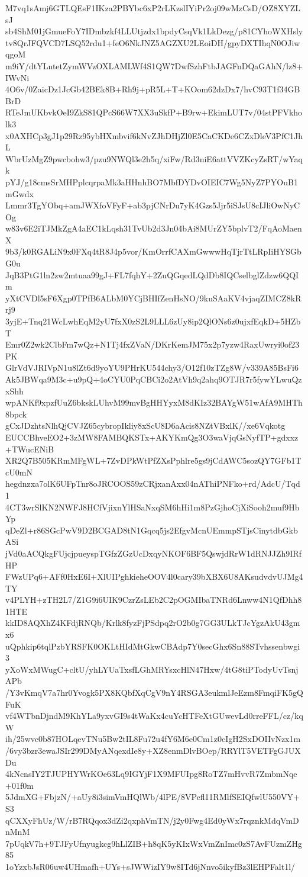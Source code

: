 M7vq1sAmj6GTLQEsF1IKza2PBYbc6xP2rLKzslIYiPr2oj09wMzCsD/OZ8XYZLsJ
sb4ShM01jGmueFoY7IDmbzkf4LLUtjzdx1bpdyCsqVk1LkDezg/p81CYhoWXHsly
tv8QrJFQVCD7LSQ52rdu1+feO6NkJNZ5AGZXU2LEoiDH/gpyDXTIhqN0OJiwqgoM
m9iY/dtYLntetZymWVzOXLAMLWf4S1QW7DwfSzhFtbJAGFnDQaGAhN/lz8+IWvNi
4O6v/0ZaicDz1JcGb42BEk8B+Rh9j+pR5L+T+KOom62dzDx7/hvC93T1f34GBBrD
RTeJmUKbvkOeI9ZkS81QPcS66W7XX3uSkfP+B9rw+EkimLUT7v/04stPFVkholk3
x0AXHCp3gJ1p29Rz95ybHXmbvif6kNvZJhDHjZl0E5CaCKDe6CZxDleV3PfC1JhL
WbrUzMgZ9pwcbohw3/pzu9NWQl3e2h5q/xiFw/Rd3niE6attVVZKcyZsRT/wYaqk
pYJ/g18cmsSrMHPplcqrpaMk3aHHnhBO7MbfDYDvOIEIC7Wg5NyZ7PYOuB1mGwdx
Lmmr3TgYObq+amJWXfoVFyF+ab3pjCNrDu7yK4Gzs5Jjr5iSJsU8cIJliOwNyCOg
w83v6E2iTJMkZgA4aEC1kLqsh31TvUb2d3Jn04bAi8MUrZY5bplvT2/FqAoMaenX
9b3/k0RGALiN9x0FXq4tR8J4p5vor/KmOrrfCAXmGwwwHqTjrTtLRpIiHYSGbG0u
JqB3PtG1ln2zw2mtuaa99gJ+FL7fqhY+2ZuQGqedLQdDb8IQCselbglZdzw6QQIm
yXtCVDl5sF6Xgp0TPfB6ALbM0YCjBHIfZenHsNO/9kuSAaKV4vjaqZIMCZ8kRrj9
3yjE+Tnq21WcLwhEqM2yU7fxX0zS2L9LLL6zUy8ip2QlONs6z0ujxfEqkD+5HZbT
Emr0Z2wk2ClbFm7wQz+N1Tj4fxZVaN/DKrKemJM75x2p7yzw4RaxUwryi0of23PK
GlrVdVJRIVpN1u8lZt6d9yoYU9PHrKU544chy3/O12f10zTZg8W/v339A85BsFi6
Ak5JBWqa9M3c+u9pQ+4oCYU0PqCBCi2o2AtVh9q2ahq9OTJR7r5fywYLwuQzxShh
wpANKf9xpzfUuZ6bkskLUhvM99mvBgHHYyxM8dKIz32BAYgW51wAfA9MHTh8bpck
gCxJDzhtsNlhQjCVJZ65cybropIkliy8xScU8D6aAcis8NZtVBxlK//xe6Vqkotg
EUCCBhveEO2+3zMW8FAMBQKSTx+AKYKmQg3O3waVjqGsNyfTP+gdxxz+TWucENiB
XR2Q7B505KRmMFgWL+7ZvDPkWtPfZXsPphlre5gs9jCdAWC5sozQY7GFb1TcU0mN
hegdnzxa7olK6UFpTnr8oJRCOOS59zCRjxanAxx04nAThiPNFko+rd/AdcU/Tqd1
4CT3wrSlKN2NWFJ8HCfVjixnYlHSaNxqSM6hHi1m8PzGjhoCjXiSooh2muf9HbYp
qDeZl+r86SGcPwV9D2BCGAD8tN1Gqcq5js2EfgvMcnUEmmpSTjsCinytdbGkbASi
jVd0aACQkgFUjcjpueyspTGfzZGzUcDxqyNKOF6BF5QswjdRrW1dRNJJZh9IRfHP
FWzUPq6+AFf0HxE6I+XlUIPghkieheOOV4l0cary39bXBX6U8AKsudvdvUJMg4TY
v4PLYH+zTH2L7/Z1G9i6UIK9CzrZsLEb2C2pOGMIbaTNRd6Lnww4N1QfDhh81HTE
kkID8AQXhZ4KFdjRNQb/Krlk8fyzFjPSdpq2rO2b0g7GG3ULkTJcYgzAkU43gmx6
uQphkip6tqlPzbYRSFK0OKLtHIdMtGkwCBAdp7Y0secGhx6Sn88STvhssenbwgi3
yXoWxMWugC+cltU/yhLYUaTxsfLGhMRYsxcHlN47Hxw/4tG8tiPTodyUvTsnjAPb
/Y3vKmqV7a7hr0Yvogk5PX8KQbfXqCgV9nY4RSGA3eukmlJeEzm8FmqiFK5gQFuK
vf4WTbnDjndM9KhYLa9yxvGI9s4tWaKx4cuYcHTFeXtGUwevLd0rreFFL/cz/kqW
ih/25wvc0b87HOLqevTNu5Bw2tIL8Fu72u4fY6M6e0Cm1z0cIgH2SxDOIIvNzx1m
/6vy3bzr3ewaJSIr299DMyANqexdIe8y+XZ8enmDlvBOep/RRYlT5VETFgGJUXDu
4kNcnsIY2TJUPHYWrKOe63Lq9IGYjF1X9MFUIpg8RoTZ7mHvvR7ZmbmNqe+01f0m
5JdmXG+FbjzN/+aUy8i3simVmHQlWb/4lPE/8VPefl11RMlfSEIQfwlU550VY+S3
qCXXyFhUz/W/rB7RQqox3dZi2qxphVmTN/j2y0Fwg4Ed0yWx7rqznkMdqVmDnMnM
7pUqkV7h+9TJFyUfnyugkcg9hLlZIB+h8qK5yKIxWxVmZnImc0zS7AvFUzmZHg85
1oYzxbJsR06uw4UHmafh+UYs+sJWWizIY9w8ITd6jNnvo5ikyfBz3lEHPFalt1l/
